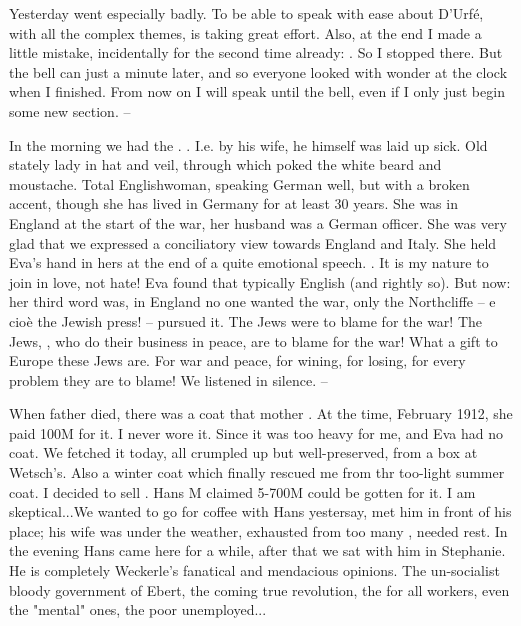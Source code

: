 
\missing Yesterday went especially badly. To be able to speak with ease about D'Urfé, with all the complex themes, is taking great effort. Also, at the end I made a little mistake, incidentally for the second time already: . So I stopped there. But the bell can just a minute later, and so everyone looked with wonder at the clock when I finished. From now on I will speak until the bell, even if I only just begin some new section. -- \missing

In the morning we had the . . I.e. by his wife, he himself was laid up sick. Old stately lady in hat and veil, through which poked the white beard and moustache. Total Englishwoman, speaking German well, but with a broken accent, though she has lived in Germany for at least 30 years. She was in England at the start of the war, her husband was a German officer. She was very glad that we expressed a conciliatory view towards England and Italy. She held Eva's hand in hers at the end of a quite emotional speech. . It is my nature to join in love, not hate! Eva found that typically English (and rightly so). But now: her third word was, in England no one wanted the war, only the Northcliffe -- e cioè the Jewish press! -- pursued it. The Jews were to blame for the war! The Jews, , who do their business in peace, are to blame for the war! What a gift to Europe these Jews are. For war and peace, for wining, for losing, for every problem they are to blame! We listened in silence. --

When father died, there was a coat that mother . At the time, February 1912, she paid 100M for it. I never wore it. Since it was too heavy for me, and Eva had no coat. We fetched it today, all crumpled up but well-preserved, from a box at Wetsch's. Also a winter coat which finally rescued me from thr too-light summer coat. I decided to sell . Hans M claimed 5-700M could be gotten for it. I am skeptical...We wanted to go for coffee with Hans yestersay, met him in front of his place; his wife was under the weather, exhausted from too many , needed rest. In the evening Hans came here for a while, after that we sat with him in Stephanie. He is completely  Weckerle's fanatical and mendacious opinions. The un-socialist bloody government of Ebert, the coming true revolution, the  for all workers, even the "mental" ones, the poor unemployed...

